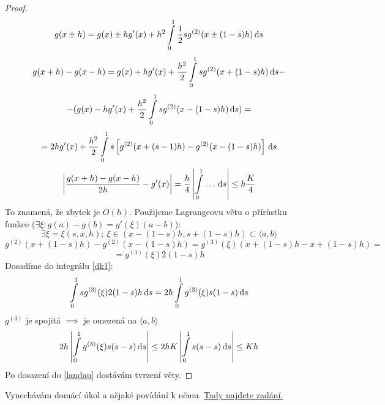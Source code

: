 	\begin{proof}
		$$ g(x \pm h) = g(x) \pm h g'(x) + h^2 \int\limits_0^1 \frac{1}{2} s g^{(2)}
		(x \pm (1-s) h)\,\mathrm{d}s$$
		$$ g(x+h) - g(x-h) = g(x) + hg'(x) + \frac{h^2}{2} \int\limits_0^1 s g^{(2)} (x + (1-s) h)\,\mathrm{d}s -$$
		$$ - ( g(x) - hg'(x) + \frac{h^2}{2} \int\limits_0^1 s g^{(2)} (x - (1-s) h)\,\mathrm{d}s) =$$
		\begin{equation} \label{dk1}
			 = 2hg'(x) + \frac{h^2}{2} \int\limits_0^1 s \left[ g^{(2)} (x + (s-1)h) - g^{(2)}
			(x - (1-s)h) \right]\,\mathrm{d}s
		\end{equation}
		$$ \left| \frac{g(x+h) - g(x-h)}{2h} - g'(x)\right| = \frac{h}{4} \left|
		\int\limits_0^1 \dots\,\mathrm{d}s\right| \leq h \frac{K}{4} $$
		To znamená, že zbytek je $O(h)$. Použijeme Lagrangeovu větu o přírůstku funkce
		($\exists \xi:g(a) - g(b) = g'(\xi)(a -b)$):
		$$ \exists \xi= \xi(s,x,h);\ \xi \in (x- (1-s)h, s+(1-s)h) \subset \langle a,b \rangle$$
		$$ g^{(2)} (x+(1-s)h) - g^{(2)} (x-(1-s)h) = g^{(3)} (\xi) (x+(1-s)h - x +(1-s)h) =$$
		$$ = g^{(3)}(\xi) 2 (1-s) h$$
		Dosadíme do integrálu \eqref{dk1}:
		$$ \int\limits_0^1 s g^{(3)} (\xi) 2 (1-s)h\,\mathrm{d}s = 2h \int\limits_0^1 g^{(3)} (\xi) s (1-s)\,\mathrm{d}s $$
		$g^{(3)}$ je spojitá $\implies$ je omezená na $\langle a,b \rangle$
		$$ 2h \left| \int\limits_0^1 g^{(3)}(\xi) s(s-s)\,\mathrm{d}s \right| \leq 2hK \left| \int\limits_0^1 s(s-s)\,\mathrm{d}s \right|
		\leq Kh$$
		Po dosazení do \eqref{landau} dostávám tvrzení věty.
	\end{proof}
	
	\begin{note}
		Vynechávám domácí úkol a nějaké povídání k němu. \href{http://geraldine.fjfi.cvut.cz/~oberhuber/data/vyuka/num/dcv1.pdf}{Tady najdete zadání.}
	\end{note}


